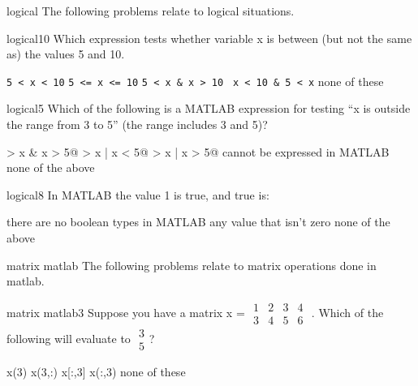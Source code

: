 \documentclass{exam}
\begin{document}

\begin{block}{logical}
The following problems relate to logical situations.
\end{block}

\begin{problem}[requires=logical]{logical}{10} 
  Which expression tests whether
  variable x is between (but not the same as) the values 5 and 10.
  \begin{answers}
    \answer \verb+5 < x < 10+
    \answer \verb+5 <= x <= 10+
    \answer \verb+5 < x & x > 10 +
    \answer[correct] \verb+x < 10 & 5 < x+ %
    \answer[fixed] none of these  %
  \end{answers}
\end{problem}

\begin{problem}[requires=logical]{logical}{5} 
  Which of the following is a MATLAB expression for testing ``x is
  outside the range from 3 to 5'' (the range includes 3 and 5)? 
  \begin{answers}  
    \answer {} > x & x > 5@
    \answer {} > x | x < 5@
    \answer[correct]  > x | x > 5@ %
    \answer[fixed] cannot be expressed in MATLAB %
    \answer[fixed] none of the above %
  \end{answers}
\end{problem}

\begin{problem}[requires=logical]{logical}{8} 
  In MATLAB the value 1 is true, and true is:
  \begin{answers} 
    \answer there are no boolean types in MATLAB
    \answer[correct] any value that isn't zero %
    \answer[fixed] none of the above %
  \end{answers}
\end{problem}

\begin{block}{matrix matlab}
The following problems relate to matrix operations done in matlab.
\end{block}

\begin{problem}[requires=matrix matlab]{matrix matlab}{3}
 Suppose you have a matrix x = \footnotesize
$\begin{array}{cccc}1 & 2 & 3 & 4\\3 & 4 & 5 & 6\end{array}$
\normalsize. Which of the following will evaluate to \footnotesize
$\begin{array}{c}3 \\ 5\end{array}$\normalsize?
  \begin{answers}   
    \answer x(3)
    \answer x(3,:)
    \answer x[:,3]
    \answer[correct] x(:,3) %
    \answer[fixed] none of these %
   \end{answers}
\end{problem}
\end{document}
